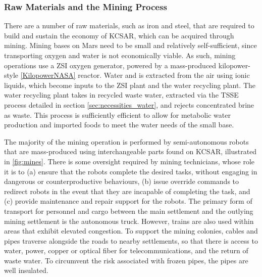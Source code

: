 \documentclass[fleqn,10pt]{Stylesheet} %
\begin{document}

\subsubsection{Raw Materials and the Mining Process}
\label{sec:necessities_raw}

There are a number of raw materials, such as iron and steel, that are required to build and sustain the economy of KCSAR, which can be acquired through mining. Mining bases on Mars need to be small and relatively self-sufficient, since transporting oxygen and water is not economically viable. As such, mining operations use a ZSI oxygen generator, powered by a mass-produced kilopower-style \ref{KilopowerNASA} reactor. Water and  is extracted from the air using ionic liquids, which become inputs to the ZSI plant and the water recycling plant. The water recycling plant takes in recycled waste water, extracted via the TSSE process detailed in section \ref{sec:necessities_water}, and rejects concentrated brine as waste. This process is sufficiently efficient to allow for metabolic water production and imported foods to meet the water needs of the small base.

The majority of the mining operation is performed by semi-autonomous robots that are mass-produced using interchangeable parts found on KCSAR, illustrated in \ref{fig:mines}. There is some oversight required by mining technicians, whose role it is to (a) ensure that the robots complete the desired tasks, without engaging in dangerous or counterproductive behaviours, (b) issue override commands to redirect robots in the event that they are incapable of completing the task, and (c) provide maintenance and repair support for the robots. The primary form of transport for personnel and cargo between the main settlement and the outlying mining settlement is the autonomous truck. However, trains are also used within areas that exhibit elevated congestion. To support the mining colonies, cables and pipes traverse alongside the roads to nearby settlements, so that there is access to water, power, copper or optical fiber for telecommunications, and the return of waste water. To circumvent the risk associated with frozen pipes, the pipes are well insulated.
\end{document}
